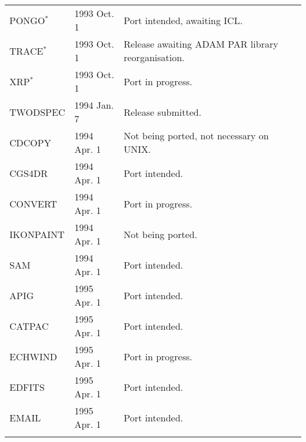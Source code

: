 \begin{table}
\begin{center}
\begin{tabular}{|p{36mm}|p{30mm}|p{60mm}|}
PONGO$^{\ast}$                  & 1993 Oct. 1  & Port intended, awaiting ICL. \\
TRACE$^{\ast}$                  & 1993 Oct. 1  & Release awaiting ADAM PAR 
   library reorganisation.\\
XRP$^{\ast}$                    & 1993 Oct. 1  & Port in progress. \\
TWODSPEC                        & 1994 Jan. 7  & Release submitted. \\
CDCOPY                          & 1994 Apr. 1  & Not being ported, not
   necessary on UNIX. \\
CGS4DR                          & 1994 Apr. 1  & Port intended. \\
CONVERT                         & 1994 Apr. 1  & Port in progress. \\
IKONPAINT                       & 1994 Apr. 1  & Not being ported. \\
SAM                             & 1994 Apr. 1  & Port intended. \\
APIG                            & 1995 Apr. 1  & Port intended. \\
CATPAC                          & 1995 Apr. 1  & Port intended. \\
ECHWIND                         & 1995 Apr. 1  & Port in progress. \\
EDFITS                          & 1995 Apr. 1  & Port intended. \\
EMAIL                           & 1995 Apr. 1  & Port intended. \\
& & \\ \hline
\end{tabular}
\end{center}
\end{table}

